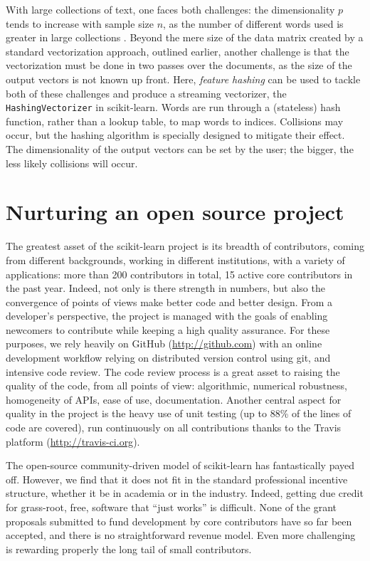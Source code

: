 \documentclass[a4paper]{article}
\begin{document}
With large collections of text, one faces both challenges:
the dimensionality $p$
tends to increase with sample size $n$, as the number of different words used
is greater in large collections \cite[88--89]{manning2009}.
Beyond the mere size of the data matrix
created by a standard vectorization approach, outlined earlier, another challenge
is that the vectorization must be done in two passes over the documents,
as the size of the output vectors is not known up front.
Here, \emph{feature hashing} can be used
to tackle both of these challenges and produce a streaming vectorizer,
the {\tt HashingVectorizer} in scikit-learn.
Words are run through a (stateless) hash function, rather than a lookup table,
to map words to indices.
Collisions may occur, but the hashing algorithm \cite{weinberger2009}
is specially designed to mitigate their effect.
The dimensionality of the output vectors can be set by the user;
the bigger, the less likely collisions will occur.

\section{Nurturing an open source project}

The greatest asset of the scikit-learn project is its breadth of
contributors, coming from different backgrounds, working in different
institutions, with a variety of applications: more than 200 contributors in
total, 15 active core contributors in the past year. Indeed, not only
is there strength in numbers, but also the convergence of points of views
make better code and better design. From a developer's perspective, the
project is managed with the goals of enabling newcomers to
contribute while keeping a high quality assurance. For these purposes, we
rely heavily on GitHub (\url{http://github.com}) with an online
development workflow relying on distributed version control using git,
and intensive code review. The code review process is a great asset to
raising the quality of the code, from all points of view: algorithmic,
numerical robustness, homogeneity of APIs, ease of use, documentation.
Another central aspect for quality in the project is the heavy use of
unit testing (up to 88\% of the lines of code are covered), run
continuously on all contributions thanks to the Travis platform
(\url{http://travis-ci.org}).

The open-source community-driven model of scikit-learn has fantastically
payed off. However, we find that it does not fit in the standard
professional incentive structure, whether it be in academia or in the
industry. Indeed, getting due credit for grass-root, free, software that
``just works'' is difficult. None of the grant proposals submitted to fund
development by core contributors have so far been accepted, and there is
no straightforward revenue model. Even more challenging is rewarding
properly the long tail of small contributors.
\end{document}
